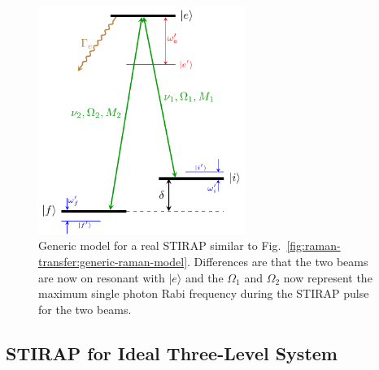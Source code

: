 \begin{figure}
  \centering
  \includegraphics[width=0.6\textwidth]{figures/raman_transfer_generic_stirap_model.pdf}
  \caption[Generic model for a real STIRAP]{
    Generic model for a real STIRAP similar to Fig.~\ref{fig:raman-transfer:generic-raman-model}.
    Differences are that the two beams are now on resonant with $|e\rangle$
    and the $\Omega_1$ and $\Omega_2$ now represent the maximum single photon Rabi frequency
    during the STIRAP pulse for the two beams.
    \label{fig:raman-transfer:generic-stirap-model}}
\end{figure}

\subsection{STIRAP for Ideal Three-Level System}
\label{ch:raman-transfer:stirap:three-level}

